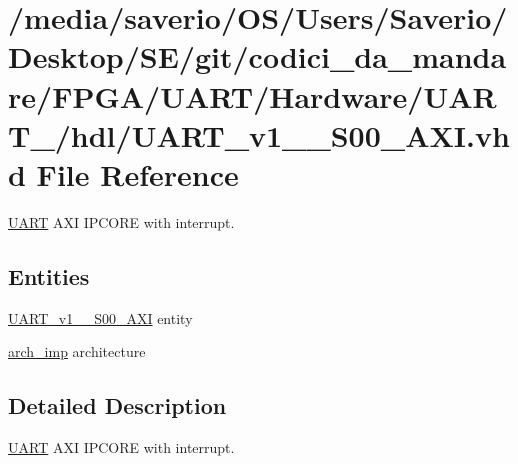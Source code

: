 \hypertarget{UART__v1__0__S00__AXI_8vhd}{}\section{/media/saverio/\+O\+S/\+Users/\+Saverio/\+Desktop/\+S\+E/git/codici\+\_\+da\+\_\+mandare/\+F\+P\+G\+A/\+U\+A\+R\+T/\+Hardware/\+U\+A\+R\+T\+\_/hdl/\+U\+A\+R\+T\+\_\+v1\+\_\+\_\+\+S00\+\_\+\+A\+XI.vhd File Reference}
\label{UART__v1__0__S00__AXI_8vhd}


\hyperlink{structUART}{U\+A\+RT} A\+XI I\+P\+C\+O\+RE with interrupt.  


\subsection*{Entities}
\begin{DoxyCompactItemize}
\item 
\hyperlink{classUART__v1__0__S00__AXI}{U\+A\+R\+T\+\_\+v1\+\_\+\_\+\+S00\+\_\+\+A\+XI} entity
\item 
\hyperlink{classUART__v1__0__S00__AXI_1_1arch__imp}{arch\+\_\+imp} architecture
\end{DoxyCompactItemize}


\subsection{Detailed Description}
\hyperlink{structUART}{U\+A\+RT} A\+XI I\+P\+C\+O\+RE with interrupt. 

